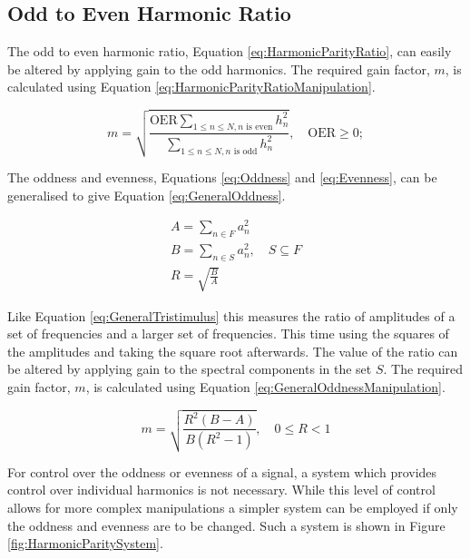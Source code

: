 	\subsection{Odd to Even Harmonic Ratio}
	\label{sec:FeatureControl-Parameterisation-HarmonicParityRatio}
		The odd to even harmonic ratio, Equation \ref{eq:HarmonicParityRatio}, can easily be altered by applying
		gain to the odd harmonics. The required gain factor, $m$, is calculated using Equation
		\ref{eq:HarmonicParityRatioManipulation}.

		\begin{equation}
			m = \sqrt{\frac{\mathrm{OER}\sum_{1 \leq n \leq N, n \text{ is even}} h_{n}^{2}}
				       {\sum_{1 \leq n \leq N, n \text{ is odd}} h_{n}^{2}}},
				       \quad \mathrm{OER} \geq 0;
		       \label{eq:HarmonicParityRatioManipulation}
		\end{equation}

		The oddness and evenness, Equations \ref{eq:Oddness} and \ref{eq:Evenness}, can be generalised to give
		Equation \ref{eq:GeneralOddness}.

		\begin{gather}
			A = \sum_{n \in F} a_{n}^{2} \nonumber \\
			B = \sum_{n \in S} a_{n}^{2}, \quad S \subseteq F \nonumber \\
			R = \sqrt{\frac{B}{A}}
			\label{eq:GeneralOddness}
		\end{gather}

		Like Equation \ref{eq:GeneralTristimulus} this measures the ratio of amplitudes of a set of frequencies and
		a larger set of frequencies. This time using the squares of the amplitudes and taking the square root
		afterwards. The value of the ratio can be altered by applying gain to the spectral components in the set
		$S$. The required gain factor, $m$, is calculated using Equation \ref{eq:GeneralOddnessManipulation}.

		\begin{equation}
			m = \sqrt{\frac{R^{2}(B - A)}{B(R^{2} - 1)}}, \quad 0 \leq R < 1
			\label{eq:GeneralOddnessManipulation}
		\end{equation}

		For control over the oddness or evenness of a signal, a system which provides control over individual
		harmonics is not necessary. While this level of control allows for more complex manipulations a simpler
		system can be employed if only the oddness and evenness are to be changed.  Such a system is shown in
		Figure \ref{fig:HarmonicParitySystem}.


